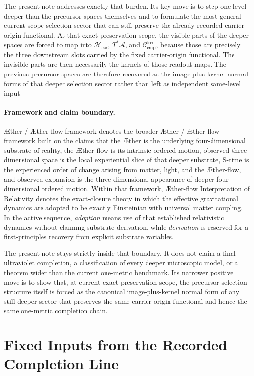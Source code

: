 \documentclass[11pt]{article}
\newcommand{\Aether}{\AE{}ther}
\newcommand{\Aflow}{\AE{}ther-flow}
\newcommand{\TheoryName}{\Aflow{} Interpretation of Relativity}
\newcommand{\TheoryProgram}{\Aether{} / \Aflow{} framework}
\newcommand{\Sub}{\mathcal A}
\newcommand{\CompFree}{\mathscr C_{\mathrm{cmp}}^{\mathrm{free}}}
\newcommand{\CarrierClass}{\mathscr H_{\mathrm{car}}}
\begin{document}
The present note addresses exactly that burden. Its key move is to step one level deeper than the precursor spaces themselves and to formulate the most general current-scope selection sector that can still preserve the already recorded carrier-origin functional. At that exact-preservation scope, the visible parts of the deeper spaces are forced to map into \(\CarrierClass\), \(T^*\Sub\), and \(\CompFree\), because those are precisely the three downstream slots carried by the fixed carrier-origin functional. The invisible parts are then necessarily the kernels of those readout maps. The previous precursor spaces are therefore recovered as the image-plus-kernel normal forms of that deeper selection sector rather than left as independent same-level input.

\paragraph{Framework and claim boundary.}
\TheoryProgram{} denotes the broader \Aether{} / \Aflow{} framework built on the claims that the \Aether{} is the underlying four-dimensional substrate of reality, the \Aflow{} is its intrinsic ordered motion, observed three-dimensional space is the local experiential slice of that deeper substrate, S-time is the experienced order of change arising from matter, light, and the \Aflow{}, and observed expansion is the three-dimensional appearance of deeper four-dimensional ordered motion. Within that framework, \TheoryName{} denotes the exact-closure theory in which the effective gravitational dynamics are adopted to be exactly Einsteinian with universal matter coupling. In the active sequence, \emph{adoption} means use of that established relativistic dynamics without claiming substrate derivation, while \emph{derivation} is reserved for a first-principles recovery from explicit substrate variables.

The present note stays strictly inside that boundary. It does not claim a final ultraviolet completion, a classification of every deeper microscopic model, or a theorem wider than the current one-metric benchmark. Its narrower positive move is to show that, at current exact-preservation scope, the precursor-selection structure itself is forced as the canonical image-plus-kernel normal form of any still-deeper sector that preserves the same carrier-origin functional and hence the same one-metric completion chain.

\section{Fixed Inputs from the Recorded Completion Line}
\end{document}
